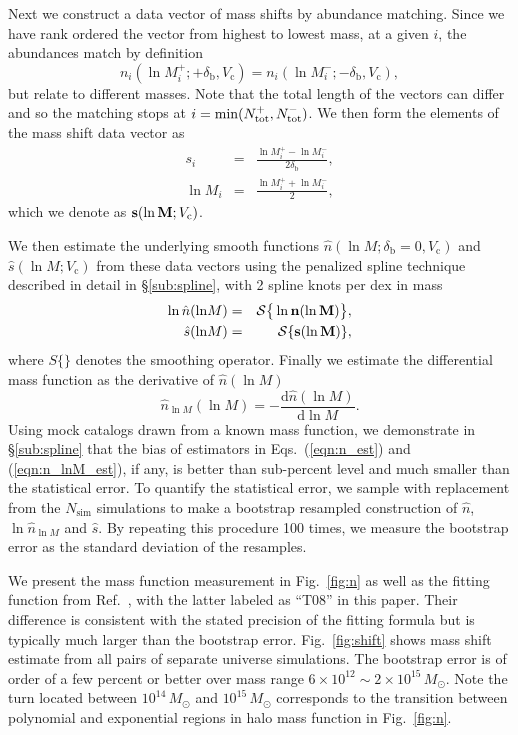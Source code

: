 \documentclass[prd,twocolumn,amsmath,amssymb,floatfix,superscriptaddress]{revtex4-1}
\newcommand{\br}{\textrm{b}}
\newcommand{\dr}{\mathrm{d}}
\newcommand{\lnM}{{\ln\!M}}
\newcommand{\VL}{V_\textrm{c}}
\begin{document}
Next we construct a data vector of mass shifts by abundance matching.  Since we have rank 
ordered the vector from highest to lowest mass, at a given $i$, the abundances 
match by definition
\begin{equation}
n_i(\ln M_i^+;+\delta_\br,\VL) =n_i(\ln M_i^-;-\delta_\br,\VL),
\end{equation}
but relate to different masses.   Note that the total length of the vectors can differ and
so the matching stops at $i={\rm min}( N_{\rm tot}^+ ,N_{\rm tot}^-)$.
We  then form the elements of the mass shift data vector as
\begin{eqnarray}
    s_i &=& \frac{\ln M_i^+ - \ln M_i^-}{2\delta_\br}, \nonumber\\
    \ln M_i &=&\frac{ \ln M_i^+  + \ln M_i^-}{2},
    \label{eqn:s_data}
\end{eqnarray}
which we denote as ${\bf s}(\ln {\bf M};\VL)$.

We then estimate  the underlying smooth functions $\hat n(\ln M;\delta_\br=0,\VL)$ and $\hat s(\ln M;\VL)$ from these data vectors
using the penalized spline technique described in detail in \S\ref{sub:spline},
with 2 spline knots per dex in mass
\begin{eqnarray}
    \ln \hat n(\lnM) &=& \mathcal{S}\big\{\ln {\bf n} (\ln{\bf M})\big\}, 
    \label{eqn:n_est}    
    \\
      \hat s(\lnM) & =& \mathcal{S}\{{\bf s}(\ln{\bf M})\},
\label{eqn:s_est}
\end{eqnarray}
where $S\{\}$ denotes the smoothing operator.
Finally we  estimate the differential mass function as the derivative of $\hat n(\ln M)$
\begin{equation}
    \hat n_\lnM(\lnM) = -\frac{\dr\hat n(\lnM)}{\dr\lnM}.
    \label{eqn:n_lnM_est}
\end{equation}
Using mock catalogs drawn from a known mass function, 
we demonstrate in \S\ref{sub:spline} that the bias of estimators in
Eqs.~(\ref{eqn:n_est}) and (\ref{eqn:n_lnM_est}), if any, is better than sub-percent level
and much smaller than the statistical error.
To quantify the statistical error, we  sample  with replacement from the $N_\textrm{sim}$
simulations to make a bootstrap resampled  construction of $\hat n$, $\ln \hat n_{\ln M}$ and
 $\hat s$.  By repeating this procedure 100 times, we  measure the bootstrap error as the standard deviation  of  the resamples.


We present the mass function measurement in Fig.~\ref{fig:n}
as well as the fitting function from Ref.~\cite{TinkerKravEtAl08},
with the latter labeled as ``T08'' in this paper.
Their difference is consistent with the stated precision of the fitting formula but is typically
much larger than the bootstrap error.
Fig.~\ref{fig:shift} shows mass shift estimate from all pairs of separate universe simulations.
The bootstrap error is of order of a few percent or better over mass range $6\times10^{12}\sim2\times10^{15}\,M_\odot$.
Note the turn located between $10^{14}\,M_\odot$ and $10^{15}\,M_\odot$
corresponds to the transition between polynomial and exponential regions
in halo mass function in Fig.~\ref{fig:n}.
\end{document}

